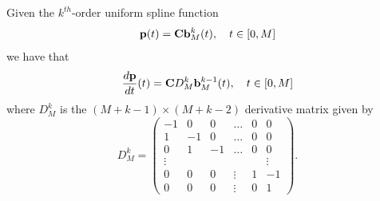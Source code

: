 \begin{lemma} \label{lem:derivative_of_spline_not_clamped}
Given the $k^{th}$-order uniform spline function
\[
\mathbf{p}(t) = \mathbf{C} \mathbf{b}_M^k(t), \quad t\in[0, M]
\]
we have that
\[
\frac{d\mathbf{p}}{dt}(t) = \mathbf{C} D_M^k \mathbf{b}_M^{k-1}(t), \quad t\in[0, M]
\]	
where $D_M^k$ is the $(M+k-1)\times (M+k-2)$ derivative matrix given by
\begin{equation}\label{eq:D_k}
D_M^k = \begin{pmatrix} -1 & 0 & 0 & \dots & 0 & 0 \\ 
 						 1 & -1 & 0 & \dots & 0 & 0 \\
 						 0 & 1 & -1 & \dots & 0 & 0\\
 						 \vdots & & & & & \vdots \\
 						 0 & 0 & 0 & \vdots & 1 & -1 \\
 						 0 & 0 & 0 & \vdots & 0 & 1
 		\end{pmatrix}.
\end{equation}
\end{lemma}


